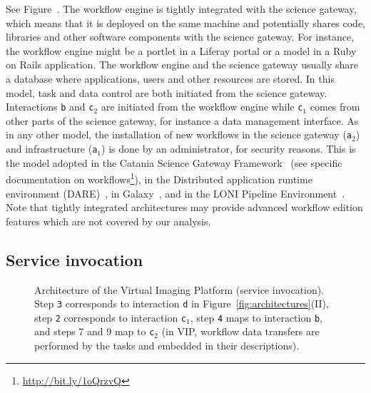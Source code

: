 \documentclass[preprint,3p,twocolumn]{elsarticle}
\begin{document}
See Figure~. The workflow engine is tightly
integrated with the science gateway, which means that it is deployed
on the same machine and potentially shares code, libraries and other
software components with the science gateway. For instance, the
workflow engine might be a portlet in a Liferay portal or a model
in a Ruby on Rails application. The workflow engine and the science
gateway usually share a database where applications, users and other
resources are stored.  In this model, task and
data control are both initiated from the science gateway. Interactions
\texttt{b} and \texttt{c$_2$} are initiated from the workflow engine
while \texttt{c$_1$} comes from other parts of the science gateway,
for instance a data management interface. As in any other model, the
installation of new workflows in the science gateway (\texttt{a$_2$})
and infrastructure (\texttt{a$_1$}) is done by an administrator, for
security reasons. This is the model adopted in the Catania Science
Gateway Framework~\cite{ardizzone2012decide} (see specific documentation on
workflows\footnote{\url{http://bit.ly/1oQrzvQ}}), in the Distributed
application runtime environment
(DARE)~\cite{maddineni2012distributed}, in
Galaxy~\cite{goecks2010galaxy}, and in the LONI Pipeline
Environment~\cite{dinov2009efficient}. Note that tightly integrated
architectures may provide advanced workflow edition features which are
not covered by our analysis.

\subsection{Service invocation}

\begin{figure}
\centering
\def\svgwidth{1.5\columnwidth}

\caption{Architecture of the Virtual Imaging Platform (service
  invocation).  Step \texttt{3} corresponds to interaction \texttt{d}
  in Figure~\ref{fig:architectures}(II), step \texttt{2} corresponds to
  interaction \texttt{c$_1$}, step \texttt{4} maps to interaction
  \texttt{b}, and steps 7 and 9 map to \texttt{c$_2$} (in VIP, workflow data transfers are
  performed by the tasks and embedded in their descriptions).}
\label{fig:vip-architecture}
\end{figure}
\end{document}
